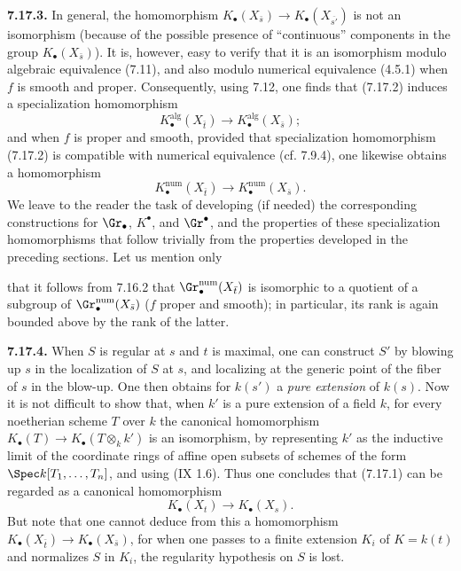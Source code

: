 \textbf{7.17.3.} In general, the homomorphism \(K_\bullet(X_{\bar s})\to K_\bullet(X_{\overline{s'}})\) is not an isomorphism (because of the possible presence of ``continuous'' components in the group \(K_\bullet(X_{\bar s})\)). It is, however, easy to verify that it is an isomorphism modulo algebraic equivalence (7.11), and also modulo numerical equivalence (4.5.1) when \(f\) is smooth and proper. Consequently, using 7.12, one finds that (7.17.2) induces a specialization homomorphism
\begin{equation}\tag{7.17.3.1}
  K_\bullet^{\mathrm{alg}}(X_{\bar t})\longrightarrow
  K_\bullet^{\mathrm{alg}}(X_{\bar s});
\end{equation}
and when \(f\) is proper and smooth, provided that specialization homomorphism (7.17.2) is compatible with numerical equivalence (cf. 7.9.4), one likewise obtains a homomorphism
\begin{equation}\tag{7.17.3.2}
  K_\bullet^{\mathrm{num}}(X_{\bar t})\longrightarrow
  K_\bullet^{\mathrm{num}}(X_{\bar s}).
\end{equation}
We leave to the reader the task of developing (if needed) the corresponding constructions for \(\Gr_\bullet\), \(K^\bullet\), and \(\Gr^\bullet\), and the properties of these specialization homomorphisms that follow trivially from the properties developed in the preceding sections. Let us mention only

%
that it follows from 7.16.2 that \(\Gr_\bullet^{\mathrm{num}}(X_{\bar t})\) is isomorphic to a quotient of a subgroup of \(\Gr_\bullet^{\mathrm{num}}(X_{\bar s})\) (\(f\) proper and smooth); in particular, its rank is again bounded above by the rank of the latter.

\textbf{7.17.4.} When \(S\) is regular at \(s\) and \(t\) is maximal, one can construct \(S'\) by blowing up \(s\) in the localization of \(S\) at \(s\), and localizing at the generic point of the fiber of \(s\) in the blow-up. One then obtains for \(k(s')\) a \emph{pure extension} of \(k(s)\). Now it is not difficult to show that, when \(k'\) is a pure extension of a field \(k\), for every noetherian scheme \(T\) over \(k\) the canonical homomorphism \(K_\bullet(T)\to K_\bullet(T\otimes_k k')\) is an isomorphism, by representing \(k'\) as the inductive limit of the coordinate rings of affine open subsets of schemes of the form \(\Spec k[T_1,\ldots,T_n]\), and using (IX 1.6). Thus one concludes that (7.17.1) can be regarded as a canonical homomorphism
\begin{equation}\tag{7.17.4.1}
  K_\bullet(X_t)\longrightarrow K_\bullet(X_s).
\end{equation}
But note that one cannot deduce from this a homomorphism \(K_\bullet(X_{\bar t})\to K_\bullet(X_{\bar s})\), for when one passes to a finite extension \(K_i\) of \(K=k(t)\) and normalizes \(S\) in \(K_i\), the regularity hypothesis on \(S\) is lost.

